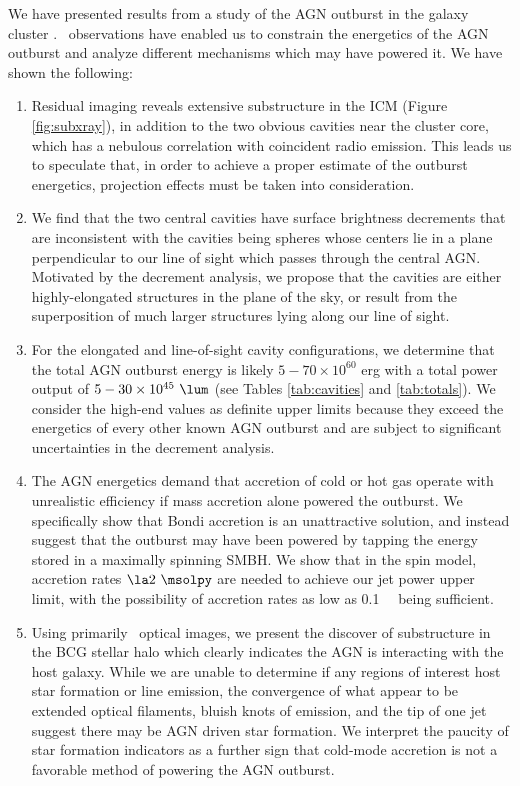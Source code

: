 \documentclass[iop]{emulateapj}
\begin{document}
We have presented results from a study of the AGN outburst in the
galaxy cluster \rbs. \cxo\ observations have enabled us to constrain
the energetics of the AGN outburst and analyze different mechanisms
which may have powered it. We have shown the following:
\begin{enumerate}
\item Residual imaging reveals extensive substructure in the ICM
  (Figure \ref{fig:subxray}), in addition to the two obvious cavities
  near the cluster core, which has a nebulous correlation with
  coincident radio emission. This leads us to speculate that, in order
  to achieve a proper estimate of the outburst energetics, projection
  effects must be taken into consideration.
\item We find that the two central cavities have surface brightness
  decrements that are inconsistent with the cavities being spheres
  whose centers lie in a plane perpendicular to our line of sight which
  passes through the central AGN. Motivated by the decrement analysis,
  we propose that the cavities are either highly-elongated structures
  in the plane of the sky, or result from the superposition of much
  larger structures lying along our line of sight.
\item For the elongated and line-of-sight cavity configurations, we
  determine that the total AGN outburst energy is likely $5-70 \times
  10^{60}$ erg with a total power output of $5-30 \times 10^{45}
  ~\lum$ (see Tables \ref{tab:cavities} and \ref{tab:totals}). We
  consider the high-end values as definite upper limits because they
  exceed the energetics of every other known AGN outburst and are
  subject to significant uncertainties in the decrement analysis.
\item The AGN energetics demand that accretion of cold or hot gas
  operate with unrealistic efficiency if mass accretion alone powered
  the outburst. We specifically show that Bondi accretion is an
  unattractive solution, and instead suggest that the outburst may
  have been powered by tapping the energy stored in a maximally
  spinning SMBH. We show that in the spin model, accretion rates $\la
  2 ~\msolpy$ are needed to achieve our jet power upper limit, with
  the possibility of accretion rates as low as 0.1 ~\msolpy\ being
  sufficient.
\item Using primarily \hst\ optical images, we present the discover of
  substructure in the BCG stellar halo which clearly indicates the AGN
  is interacting with the host galaxy. While we are unable to
  determine if any regions of interest host star formation or line
  emission, the convergence of what appear to be extended optical
  filaments, bluish knots of emission, and the tip of one jet suggest
  there may be AGN driven star formation. We interpret the paucity of
  star formation indicators as a further sign that cold-mode accretion
  is not a favorable method of powering the AGN outburst.
\end{enumerate}
\end{document}

